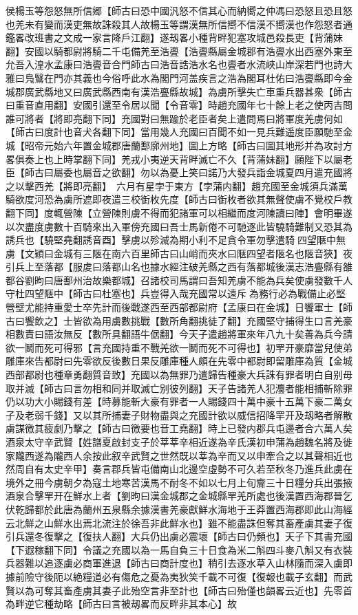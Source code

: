 侯楊玉等怨怒無所信郷【師古曰恐中國汎怒不信其心而納嚮之仲馮曰恐怒且恐且怒也羌未有變而漢吏無故誅殺其人故楊玉等謂漢無所信嚮不信漢不嚮漢也作怨怒者通鑑畧改班書之文成一家言降戶江翻】遂刼畧小種背畔犯塞攻城邑殺長吏【背蒲妹翻】安國以騎都尉將騎二千屯備羌至浩亹【浩亹縣屬金城郡有浩亹水出西塞外東至允吾入湟水孟康曰浩亹音合門師古曰浩音誥浩水名也亹者水流峽山岸深若門也詩大雅曰鳬鷖在門亦其義也今俗呼此水為閣門河盖疾言之浩為閣耳杜佑曰浩亹縣即今金城郡廣武縣地又曰廣武縣西南有漢浩亹縣故城】為虜所擊失亡車重兵器甚衆【師古曰重音直用翻】安國引還至令居以聞【令音零】時趙充國年七十餘上老之使丙吉問誰可將者【將即亮翻下同】充國對曰無踰於老臣者矣上遣問焉曰將軍度羌虜何如【師古曰度計也音犬各翻下同】當用幾人充國曰百聞不如一見兵難遥度臣願馳至金城【昭帝元始六年置金城郡唐蘭鄯廓州地】圖上方略【師古曰圖其地形并為攻討方畧俱奏上也上時掌翻下同】羌戎小夷逆天背畔滅亡不久【背蒲妹翻】願陛下以屬老臣【師古曰屬委也屬音之欲翻】勿以為憂上笑曰諾乃大發兵詣金城夏四月遣充國將之以擊西羌【將即亮翻】　六月有星孛于東方【孛蒲内翻】趙充國至金城須兵滿萬騎欲度河恐為虜所遮即夜遣三校衘枚先度【師古曰衘枚者欲其無聲使虜不覺校戶教翻下同】度輒營陳【立營陳則虜不得而犯諸軍可以相繼而度河陳讀曰陣】會明畢遂以次盡度虜數十百騎來出入軍傍充國曰吾士馬新倦不可馳逐此皆驍騎難制又恐其為誘兵也【驍堅堯翻誘音酉】擊虜以殄滅為期小利不足貪令軍勿擊遣騎四望陿中無虜【文穎曰金城有三陿在南六百里師古曰山峭而夾水曰陿四望者陿名也陿音狹】夜引兵上至落都【服䖍曰落都山名也據水經注破羌縣之西有落都城後漢志浩亹縣有雒都谷劉昫曰唐鄯州治故樂都城】召諸校司馬謂曰吾知羌虜不能為兵矣使虜發數千人守杜四望陿中【師古曰杜塞也】兵豈得入哉充國常以遠斥為務行必為戰備止必堅營壁尤能持重愛士卒先計而後戰遂西至西部都尉府【孟康曰在金城】日饗軍士【師古曰饗飲之】士皆欲為用虜數挑戰【數所角翻挑徒了翻】充國堅守捕得生口言羌豪相數責曰語汝無反【數所具翻語牛倨翻】今天子遣趙將軍來年八九十矣善為兵今請欲一鬭而死可得邪【言充國持重不戰羌欲一鬭而死不可得也】初䍐开豪靡當兒使弟雕庫來告都尉曰先零欲反後數日果反雕庫種人頗在先零中都尉即留雕庫為質【金城西部都尉也種章勇翻質音致】充國以為無罪乃遣歸告種豪大兵誅有罪者明白自别毋取并滅【師古曰言勿相和同并取滅亡别彼列翻】天子告諸羌人犯灋者能相捕斬除罪仍以功大小賜錢有差【時募能斬大豪有罪者一人賜錢四十萬中豪十五萬下豪二萬女子及老弱千錢】又以其所捕妻子財物盡與之充國計欲以威信招降䍐开及刼略者解散虜謀徼其疲劇乃擊之【師古曰徼要也音工堯翻】時上已發内郡兵屯邊者合六萬人矣酒泉太守辛武賢【姓譜夏啟封支子於莘莘辛相近遂為辛氏漢初申蒲為趙魏名將及徙家隴西遂為隴西人余按此叙辛武賢之世然既以莘為辛而又以申牽合之以其聲相近也然周自有太史辛甲】奏言郡兵皆屯備南山北邊空虛勢不可久若至秋冬乃進兵此虜在境外之冊今虜朝夕為寇土地寒苦漢馬不耐冬不如以七月上旬齎三十日糧分兵出張掖酒泉合擊䍐开在鮮水上者【劉昫曰漢金城郡之金城縣䍐羌所處也後漢置西海郡晉乞伏乾歸都於此唐為蘭州五泉縣余據漢書羌豪獻鮮水海地于王莽置西海郡即此山海經云北鮮之山鮮水出焉北流注於徐吾非此鮮水也】雖不能盡誅但奪其畜產虜其妻子復引兵還冬復擊之【復扶人翻】大兵仍出虜必震壞【師古曰仍頻也】天子下其書充國【下遐稼翻下同】令議之充國以為一馬自負三十日食為米二斛四斗麥八斛又有衣裝兵器難以追逐虜必商軍進退【師古曰商計度也】稍引去逐水草入山林隨而深入虜即據前險守後阨以絶糧道必有傷危之憂為夷狄笑千載不可復【復報也載子玄翻】而武賢以為可奪其畜產虜其妻子此殆空言非至計也【師古曰殆僅也韻畧云近也】先零首為畔逆它種劫略【師古曰言被刼畧而反畔非其本心】故